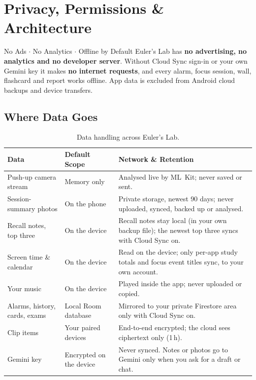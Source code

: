 \documentclass[11pt,a4paper]{article}
\begin{document}
\section{Privacy, Permissions \& Architecture}

\begin{wpbox}[wpteal]{No Ads $\cdot$ No Analytics $\cdot$ Offline by Default}
Euler's Lab has \textbf{no advertising, no analytics and no developer server}. Without Cloud Sync sign-in or your own Gemini key it makes \textbf{no internet requests}, and every alarm, focus session, wall, flashcard and report works offline. App data is excluded from Android cloud backups and device transfers.
\end{wpbox}

\subsection{Where Data Goes}
\begin{table}[H]
\centering
\small
\begin{tabularx}{\textwidth}{@{}L{3.5cm}L{3.2cm}Y@{}}
\toprule
\textbf{\sffamily Data} & \textbf{\sffamily Default Scope} & \textbf{\sffamily Network \& Retention} \\
\midrule
Push-up camera stream & Memory only & Analysed live by ML~Kit; never saved or sent. \\
Session-summary photos & On the phone & Private storage, newest 90 days; never uploaded, synced, backed up or analysed. \\
Recall notes, top three & On the device & Recall notes stay local (in your own backup file); the newest top three syncs with Cloud Sync on. \\
Screen time \& calendar & On the device & Read on the device; only per-app study totals and focus event titles sync, to your own account. \\
Your music & On the device & Played inside the app; never uploaded or copied. \\
Alarms, history, cards, exams & Local Room database & Mirrored to your private Firestore area only with Cloud Sync on. \\
Clip items & Your paired devices & End-to-end encrypted; the cloud sees ciphertext only (1\,h). \\
Gemini key & Encrypted on the device & Never synced. Notes or photos go to Gemini only when you ask for a draft or chat. \\
\bottomrule
\end{tabularx}
\caption{Data handling across Euler's Lab.}
\end{table}
\end{document}
